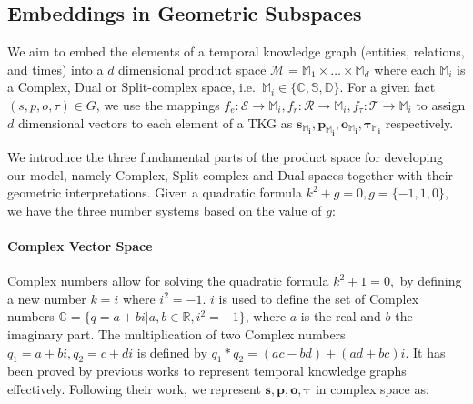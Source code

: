 \documentclass[letterpaper]{article} %
\begin{document}
\subsection{\textbf{Embeddings in Geometric Subspaces}}
We aim to embed the elements of a temporal knowledge graph (entities, relations, and times) into a $d$ dimensional product space $\mathcal{M} = \mathbb{M}_1 \times \ldots \times \mathbb{M}_d$ where each $\mathbb{M}_i$ is a Complex, Dual or Split-complex space,
i.e.\ $\mathbb{M}_i \in \{ \mathbb{C}, \mathbb{S}, \mathbb{D} \}$.
For a given fact $(s,p,o,\tau)\in G$, we use the mappings $f_e: \mathcal{E} \xrightarrow{} \mathbb{M}_i, f_r: \mathcal{R} \xrightarrow{} \mathbb{M}_i, f_{\tau}: \mathcal{T} \xrightarrow{} \mathbb{M}_i$ to assign $d$ dimensional vectors to each element of a TKG as $\boldsymbol{s_{\mathbb{M}_i},p_{\mathbb{M}_i},o_{\mathbb{M}_i}, \tau_{\mathbb{M}_i}}$ respectively. 

We introduce the three fundamental parts of the product space for developing our model, namely Complex, Split-complex and Dual spaces together with their geometric interpretations.
Given a quadratic formula $k^2 + g = 0, g = \{-1, 1, 0\}$, we have the three number systems based on the value of $g$:

\paragraph{\textbf{Complex Vector Space}} 
Complex numbers \cite{harkin2004geometry,metahelzer2000special} allow for solving the quadratic formula $k^2 + 1 = 0,$ by defining a new number $k = i$ where $i^2 = -1$. 
$i$ is used to define the set of Complex numbers $\mathbb{C} = \{q = a + b i | a, b \in \mathbb{R}, i^2 = -1\}$, where $a$ is the real and $b$ the imaginary part. The multiplication of two Complex numbers $q_1= a+bi, q_2=c+di$ is defined by $q_1 * q_2 = (ac- bd) + (ad + bc) i$. It has been proved by previous works \cite{tltcomplexzhang2022along,tcomplexlacroix2020tensor,xu2020tero} to represent temporal knowledge graphs effectively. Following their work, we represent $\boldsymbol{s,p,o, \tau}$ in complex space as:
\end{document}

